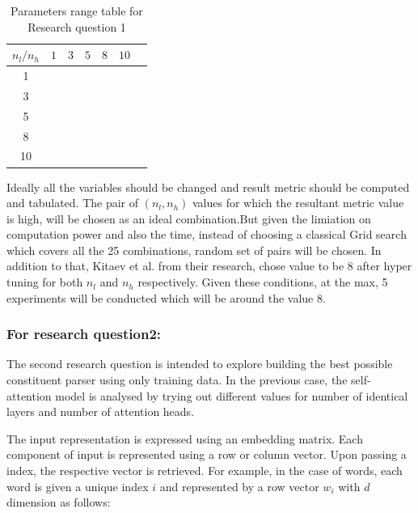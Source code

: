 \documentclass[a4paper, 11pt]{article}
\begin{document}
\begin{table}[h!]
  \begin{center}
    \begin{tabular}{c|c|c|c|c|c|c} 
      $n_l/n_h$ & $1$ & $3$ & $5$ & $8$ & $10$\\
      \hline
      1 & & & & & & \\
      \hline
      3 & & & & & \\
      \hline
      5 & & & & & \\
      \hline
      8 & & & & & \\
      \hline
      10 & & & & & \\
    \end{tabular}
    \caption{Parameters range table for Research question 1}
    \label{tab:research_question1_table1}

  \end{center}
\end{table}

Ideally all the variables should be changed and result metric should be computed and tabulated. The pair of $(n_l,n_h)$ values for which the resultant metric value is high, will be chosen as an ideal combination.But given the limiation on computation power and also the time, instead of choosing a classical Grid search which covers all the 25 combinations, random set of pairs will be chosen. In addition to that, Kitaev et al. from their research, chose value to be 8 after hyper tuning for both $n_l$ and $n_h$ respectively. Given these conditions, at the max, 5 experiments will be conducted which will be around the value 8.

\subsubsection{For research question2:}

The second research question is intended to explore building the best possible constituent parser using only training data. In the previous case, the self-attention model is analysed by trying out different values for number of identical layers and number of attention heads. 

The input representation is expressed using an embedding matrix. Each component of input is represented using a row or column vector. Upon passing a index, the respective vector is retrieved. For example, in the case of words, each word is given a unique index $i$ and represented by a row vector $w_i$ with $d$ dimension as follows:
\end{document}
